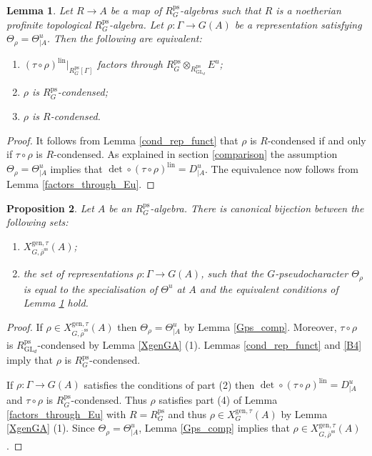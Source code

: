 \documentclass{amsart}
\newtheorem{prop}{Proposition}[section]
\newtheorem{lem}[prop]{Lemma}
\theoremstyle{definition}
\theoremstyle{remark}
\DeclareMathOperator{\GL}{GL}
\newcommand{\rhobar}{\overline{\rho}}
\newcommand{\ps}{\mathrm{ps}}
\newcommand{\gen}{\mathrm{gen}}
\newcommand{\RpsGLd}{R^{\ps}_{\GL_d}}
\newcommand{\RpsG}{R^{\ps}_G}
\newcommand{\lin}{\mathrm{lin}}
\newcommand{\rhobarss}{\rhobar^{\mathrm{ss}}}
\begin{document}
\begin{lem}\label{factors_through_Eu_G} Let $R\rightarrow A$ be a map of $\RpsG$-algebras such that $R$ is a noetherian profinite topological $\RpsG$-algebra. Let  $\rho : \Gamma \to G(A)$ be a 
representation satisfying $\Theta_{\rho}=\Theta^u_{|A}$.
Then the following are equivalent:
\begin{enumerate} 
\item $(\tau \circ \rho)^{\lin}|_{R^{\ps}_G[\Gamma]}$ factors through $R^{\ps}_G \otimes_{\RpsGLd} E^u$;
\item $\rho$ is $\RpsG$-condensed;
\item $\rho$ is $R$-condensed. 
\end{enumerate}
\end{lem}
\begin{proof} It follows from Lemma \ref{cond_rep_funct} that $\rho$ is $R$-condensed if and only if $\tau\circ \rho$
is $R$-condensed. As explained in  section \ref{comparison} 
the assumption $\Theta_{\rho}=\Theta^u_{|A}$ implies that 
$\det \circ (\tau\circ \rho)^{\lin} = D^{u}_{|A}$. The equivalence now follows from Lemma \ref{factors_through_Eu}.
\end{proof} 

\begin{prop}\label{XgenGtau_rhobarss_A} Let $A$ be an $\RpsG$-algebra. There is canonical bijection between the following sets:
\begin{enumerate}
\item $X^{\gen, \tau}_{G, \rhobarss}(A)$;
\item the set of representations $\rho : \Gamma \to G(A)$, such that the $G$-pseudocharacter $\Theta_{\rho}$ is equal to the specialisation of $\Theta^u$ at $A$ and the equivalent conditions 
of Lemma \ref{factors_through_Eu_G} hold.
\end{enumerate}
\end{prop}
\begin{proof} If $\rho\in X^{\gen, \tau}_{G, \rhobarss}(A)$ then $\Theta_{\rho}=\Theta^u_{|A}$ 
by Lemma \ref{Gps_comp}. Moreover, $\tau\circ \rho$ is $\RpsGLd$-condensed by Lemma \ref{XgenGA} (1). Lemmas \ref{cond_rep_funct} and \ref{B4} imply that $\rho$ is $R^{\ps}_G$-condensed.

If $\rho:\Gamma\rightarrow G(A)$ satisfies the conditions of part (2) then 
$\det \circ (\tau\circ \rho)^{\lin}= D^u_{|A}$ and $\tau\circ \rho$ is $R^{\ps}_G$-condensed. 
Thus $\rho$ satisfies part (4) of Lemma \ref{factors_through_Eu} with $R=R^{\ps}_G$ and thus $\rho\in X^{\gen, \tau}_{G}(A)$ by Lemma \ref{XgenGA} (1). Since $\Theta_{\rho}=\Theta^u_{|A}$, Lemma \ref{Gps_comp} implies that 
$\rho\in X^{\gen, \tau}_{G, \rhobarss}(A)$.
\end{proof}
\end{document}

